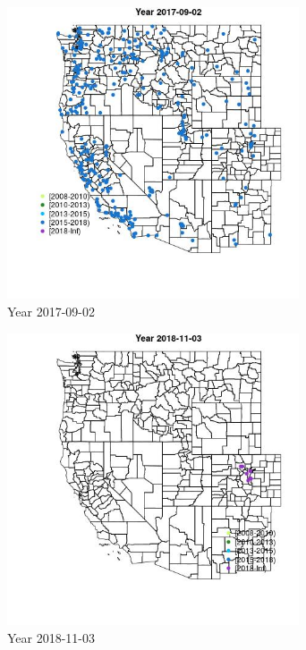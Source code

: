 \begin{figure} 
\centering  
\includegraphics[width=0.77\textwidth]{Code_Outputs/Report_ML_input_PM25_Step4_part_e_de_duplicated_aveswNAs_MapObsYear2017-09-02.jpg} 
\caption{\label{fig:Report_ML_input_PM25_Step4_part_e_de_duplicated_aveswNAsMapObsYear2017-09-02}Year 2017-09-02} 
\end{figure} 
 

\begin{figure} 
\centering  
\includegraphics[width=0.77\textwidth]{Code_Outputs/Report_ML_input_PM25_Step4_part_e_de_duplicated_aveswNAs_MapObsYear2018-11-03.jpg} 
\caption{\label{fig:Report_ML_input_PM25_Step4_part_e_de_duplicated_aveswNAsMapObsYear2018-11-03}Year 2018-11-03} 
\end{figure} 
 

